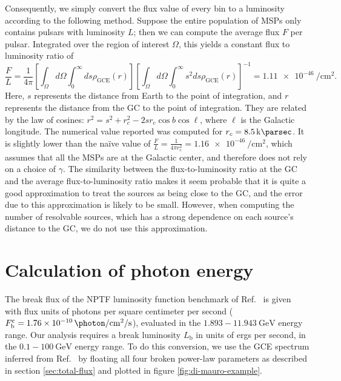\documentclass[letter,11pt]{article}
\newcommand{\brackets}[1]{\left[#1\right]}
\begin{document}
Consequently, we simply convert the flux value of every bin to a luminosity according to the following method. Suppose the entire population of MSPs only contains pulsars with luminosity $L$; then we can compute the average flux $F$ per pulsar. Integrated over the region of interest $\Omega$, this yields a constant flux to luminosity ratio of
\begin{equation}
    \frac{F}{L} = \frac{1}{4\pi}\brackets{\int_{\Omega}d\Omega\int_0^\infty ds \rho_\text{GCE} (r)}\brackets{\int_{\Omega}d\Omega \int_0^\infty s^2 ds \rho_\text{GCE} (r)}^{-1} = \SI{1.11e-46}{\per\centi\meter\squared}.
    \label{eqn:f-to-l}
\end{equation}
Here, $s$ represents the distance from Earth to the point of integration, and $r$ represents the distance from the GC to the point of integration. They are related by the law of cosines: $r^2 = s^2 + r_c^2 - 2s r_c \cos b\cos \ell$, where $\ell$ is the Galactic longitude. The numerical value reported was computed for $r_c = \SI{8.5}{\kilo\parsec}$. It is slightly lower than the na\"ive value of $\frac{F}{L} = \frac{1}{4\pi r_c^2} = \SI{1.16e-46}{\per\centi\meter\squared}$, which assumes that all the MSPs are at the Galactic center, and therefore does not rely on a choice of $\gamma$. The similarity between the flux-to-luminosity ratio at the GC and the average flux-to-luminosity ratio makes it seem probable that it is quite a good approximation to treat the sources as being close to the GC, and the error due to this approximation is likely to be small. However, when computing the number of resolvable sources, which has a strong dependence on each source's distance to the GC, we do not use this approximation.

\section{Calculation of photon energy}
\label{app:photon-energy}
The break flux of the NPTF luminosity function benchmark of Ref.~\cite{Lee:2015fea} is given with flux units of photons per square centimeter per second ($F^\text{c}_\text{b}=\SI{1.76e-10}{\photon\per\centi\meter\squared\per\second}$), evaluated in the $1.893-\SI{11.943}{\giga\electronvolt}$ energy range. Our analysis requires a break luminosity $L_\text{b}$ in units of ergs per second, in the $0.1-\SI{100}{\giga\electronvolt}$ energy range.
To do this conversion, we use the GCE spectrum inferred from Ref.~\cite{DiMauro:2021raz} by floating all four broken power-law parameters as described in section \ref{sec:total-flux} and plotted in figure \ref{fig:di-mauro-example}.
\end{document}
